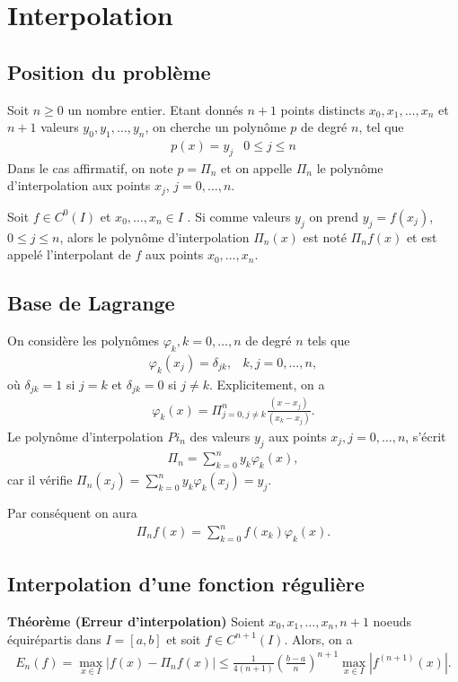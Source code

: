 \chapter{Interpolation}
\section{Position du problème}
Soit $n \geq 0$ un nombre entier. Etant donnés $n + 1$ points distincts $x_0 , x_1, \dots,x_n$ 
et $n + 1$ valeurs $y_0, y_1,\dots, y_n$, on cherche un polynôme $p$ de degré $n$, tel que
\begin{eqnarray}
	p(x)=y_j&0\leq j\leq n
\end{eqnarray}
Dans le cas affirmatif, on note $p = \Pi_n$ et on appelle $\Pi_n$ le polynôme 
d’interpolation aux points $x_j$, $j = 0, \dots , n.$ 

Soit $f \in C^0(I)$ et $x_0 ,\dots , x_n \in I$ . Si comme valeurs $y_j$ on prend $y_j = f (x_j)$, $0 \leq j \leq n$, alors le polynôme d’interpolation $\Pi_n(x)$ est noté $\Pi_n f(x)$ et est appelé l’interpolant de $f$ aux points $x_0,\dots, x_n$.

\section{Base de Lagrange}
On considère les polynômes $\varphi_k, k = 0, \dots , n$ de degré $n$ tels que 
\begin{eqnarray*}
	\varphi_k (x_j) = \delta_{jk},& k, j = 0, \dots , n, 
\end{eqnarray*}
où $\delta_{jk}= 1$ si $j=k$ et $\delta_{jk}= 0$ si $j \neq k$. Explicitement, on a
\begin{eqnarray}
	\varphi_k(x)=\Pi_{j=0,j\neq k}^n\frac{(x-x_j)}{(x_k-x_j)}.
\end{eqnarray}
Le polynôme d'interpolation $Pi_n$ des valeurs $y_j$ aux points $x_j, j=0,\dots,n$, s'écrit
\begin{eqnarray}
	\Pi_n=\sum_{k=0}^{n}y_k\varphi_k(x),
\end{eqnarray}
car il vérifie $\Pi_n(x_j)=\sum_{k=0}^ny_k\varphi_k(x_j)=y_j$.

Par conséquent on aura
\begin{eqnarray}
	\Pi_nf(x)=\sum_{k=0}^nf(x_k)\varphi_k(x).
\end{eqnarray}

\section{Interpolation d'une fonction régulière}
\textbf{Théorème (Erreur d'interpolation)}
Soient $x_0,x_1,\dots,x_n, n+1$ noeuds équirépartis dans $I=[a,b]$ et soit $f\in C^{n+1}(I)$. Alors, on a
\begin{eqnarray}
	E_n(f)=\max_{x\in I}|f(x)-\Pi_nf(x)|\leq\frac{1}{4(n+1)}\left(\frac{b-a}{n}\right)^{n+1}\max_{x\in I}|f^{(n+1)}(x)|.
\end{eqnarray}



